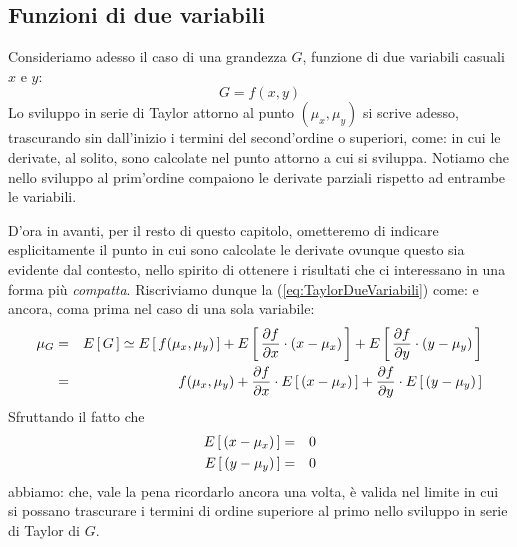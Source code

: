 \subsection{Funzioni di due variabili}

Consideriamo adesso il caso di una grandezza $G$, funzione di due variabili
casuali $x$ e $y$:
$$
G=f(x,y)
$$
Lo sviluppo in serie di Taylor attorno al punto $(\mu_x, \mu_y)$
si scrive adesso, trascurando sin dall'inizio i termini del second'ordine o
superiori, come:
in cui le derivate, al solito, sono calcolate nel punto attorno a cui
si sviluppa. Notiamo che nello sviluppo al prim'ordine compaiono
le derivate parziali rispetto ad entrambe le variabili.

D'ora in avanti, per il resto di questo capitolo, ometteremo di indicare
esplicitamente il punto in cui sono calcolate le derivate ovunque questo
sia evidente dal contesto, nello spirito di ottenere i risultati che ci
interessano in una forma pi\`u \emph{compatta}.
Riscriviamo dunque la (\ref{eq:TaylorDueVariabili}) come:
e ancora, coma prima nel caso di una sola variabile:
\begin{eqnarray*}
\mu_G & = & \displaystyle E\left[\, G \, \right] \simeq \displaystyle E\left[\, f(\mu_x, \mu_y) \, \right] +
\displaystyle E\left[\, \displaystyle \frac{\partial f}{\partial x} \cdot (x - \mu_x) \, \right] +
\displaystyle E\left[\, \displaystyle \frac{\partial f}{\partial y} \cdot (y - \mu_y) \, \right]\\
& = & f(\mu_x, \mu_y) +
\displaystyle \frac{\partial f}{\partial x} \cdot \displaystyle E\left[\, (x - \mu_x) \, \right] +
\displaystyle \frac{\partial f}{\partial y} \cdot \displaystyle E\left[\, (y - \mu_y) \, \right]
\end{eqnarray*}
Sfruttando il fatto che
\begin{eqnarray*}
\displaystyle E\left[\, (x-\mu_x) \, \right] &=& 0\\
\displaystyle E\left[\, (y-\mu_y) \, \right] &=& 0
\end{eqnarray*}
abbiamo:
che, vale la pena ricordarlo ancora una volta, \`e valida nel limite in cui
si possano trascurare i termini di ordine superiore al primo nello
sviluppo in serie di Taylor di $G$.

